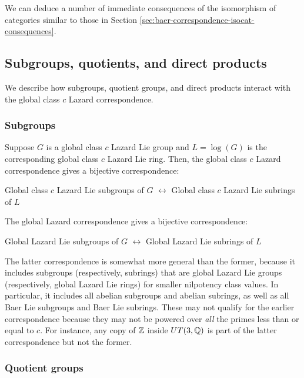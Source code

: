 We can deduce a number of immediate consequences of the isomorphism of
categories similar to those in Section
\ref{sec:baer-correspondence-isocat-consequences}.

\subsection{Subgroups, quotients, and direct products}\label{sec:global-lazard-correspondence-sub-quot-dp}

We describe how subgroups, quotient groups, and direct products
interact with the global class $c$ Lazard correspondence.

\subsubsection{Subgroups}\label{sec:global-lazard-correspondence-subgroups}

Suppose $G$ is a global class $c$ Lazard Lie group and $L = \log(G)$
is the corresponding global class $c$ Lazard Lie ring. Then, the
global class $c$ Lazard correspondence gives a bijective
correspondence:

\begin{center}
  Global class $c$ Lazard Lie subgroups of $G$ $\leftrightarrow$
  Global class $c$ Lazard Lie subrings of $L$
\end{center}

The global Lazard correspondence gives a bijective correspondence:

\begin{center}
  Global Lazard Lie subgroups of $G$ $\leftrightarrow$
  Global Lazard Lie subrings of $L$
\end{center}

The latter correspondence is somewhat more general than the former,
because it includes subgroups (respectively, subrings) that are global
Lazard Lie groups (respectively, global Lazard Lie rings) for smaller
nilpotency class values. In particular, it includes all abelian
subgroups and abelian subrings, as well as all Baer Lie subgroups and
Baer Lie subrings. These may not qualify for the earlier
correspondence because they may not be powered over {\em all} the
primes less than or equal to $c$. For instance, any copy of $\mathbb{Z}$
inside $UT(3,\mathbb{Q})$ is part of the latter correspondence but not the
former.

\subsubsection{Quotient groups}\label{sec:global-lazard-correspondence-quot}

